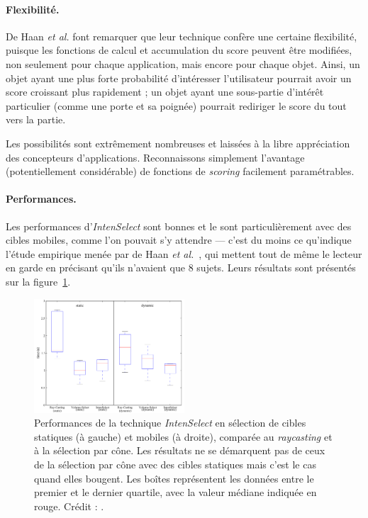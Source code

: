 	\paragraph{Flexibilité.}
	De Haan \emph{et al.} font remarquer que leur technique confère une certaine flexibilité, puisque les fonctions de calcul et accumulation du score peuvent être modifiées, non seulement pour chaque application, mais encore pour chaque objet. Ainsi, un objet ayant une plus forte probabilité d'intéresser l'utilisateur pourrait avoir un score croissant plus rapidement ; un objet ayant une sous-partie d'intérêt particulier (comme une porte et sa poignée) pourrait rediriger le score du tout vers la partie.
	
	Les possibilités sont extrêmement nombreuses et laissées à la libre appréciation des concepteurs d'applications. Reconnaissons simplement l'avantage (potentiellement considérable) de fonctions de \emph{scoring} facilement paramétrables.
	
	\paragraph{Performances.}
	Les performances d'\emph{IntenSelect} sont bonnes et le sont particulièrement avec des cibles mobiles, comme l'on pouvait s'y attendre --- c'est du moins ce qu'indique l'étude empirique menée par de Haan \emph{et al.}~\cite{de2005intenselect}, qui mettent tout de même le lecteur en garde en précisant qu'ils n'avaient que 8 sujets. Leurs résultats sont présentés sur la figure~\ref{fig:intensPerf}.
	
	\begin{figure}
		\centering
		\includegraphics[width=0.5\textwidth]{figures/ch2/intensPerf}
		\caption[\emph{IntenSelect} -- performances]{Performances de la technique \emph{IntenSelect} en sélection de cibles statiques (à gauche) et mobiles (à droite), comparée au \emph{raycasting} et à la sélection par cône. Les résultats ne se démarquent pas de ceux de la sélection par cône avec des cibles statiques mais c'est le cas quand elles bougent. Les boîtes représentent les données entre le premier et le dernier quartile, avec la valeur médiane indiquée en rouge. Crédit : \cite{de2005intenselect}.}
		\label{fig:intensPerf}
	\end{figure}
	
